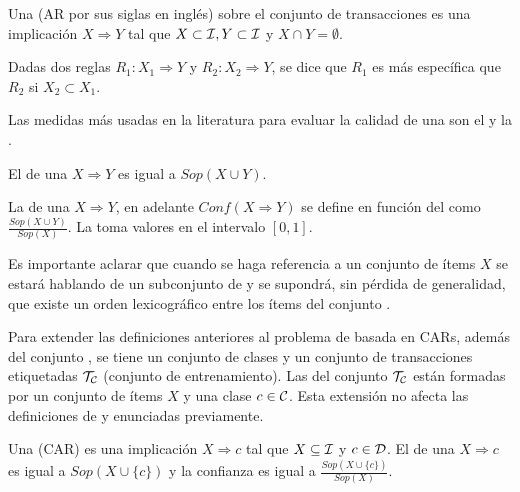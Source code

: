 \begin{Definition}[\AR]
  Una \AR (AR por sus siglas en inglés) sobre el conjunto de transacciones \T es una implicación $X\Rightarrow Y$ tal que $X\subset\I, Y\subset\I$ y $X\cap Y=\emptyset$.
\label{def:reglas-de-asociacion}
\end{Definition}

\begin{Definition}[Especificidad]
  Dadas dos reglas $R_1: X_1\Rightarrow Y$ y $R_2: X_2\Rightarrow Y$, se dice que $R_1$ es más específica que $R_2$ si $X_2\subset X_1$.
\label{def:especificidad}
\end{Definition}

Las medidas más usadas en la literatura para evaluar la calidad de una \AR son el \soporte y la \confianza.

\begin{Definition}
  El \soporte de una \ar $X\Rightarrow Y$ es igual a $Sop(X\cup Y)$.
\label{def:soporte-de-una-AR}
\end{Definition}

\begin{Definition}
  La \confianza de una \ar $X\Rightarrow Y$, en adelante $Conf(X\Rightarrow Y)$ se define en función del \soporte como $\frac{Sop(X\cup Y)}{Sop(X)}$. La \confianza toma valores en el intervalo $[0,1]$.
\label{def:confianza-de-una-AR}
\end{Definition}

Es importante aclarar que cuando se haga referencia a un conjunto de ítems $X$ se estará hablando de un subconjunto de \I y se supondrá, sin pérdida de generalidad, que existe un orden lexicográfico entre los ítems del conjunto \I.

Para extender las definiciones anteriores al problema de \clasificacion basada en CARs, además del conjunto \I, se tiene un conjunto de clases \C y un conjunto de transacciones etiquetadas $\T_\C$ (conjunto de entrenamiento). Las \transacciones del conjunto $\T_\C$ están formadas por un conjunto de ítems $X$ y una clase $c\in \C$. Esta extensión no afecta las definiciones de \soporte y \confianza enunciadas previamente.

\begin{Definition}[\CAR]
  Una \CAR (CAR) es una implicación $X\Rightarrow c$ tal que $X\subseteq\I$ y $c\in\D$. El \soporte de una \CAR $X\Rightarrow c$ es igual a $Sop(X\cup\{c\})$ y la confianza es igual a $\frac{Sop(X\cup\{c\})}{Sop(X)}$.
\label{def:CAR}
\end{Definition}

